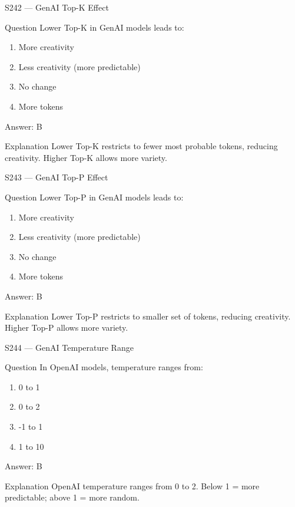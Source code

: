 \documentclass[aspectratio=169,8pt]{beamer}
\begin{document}
\begin{frame}{S242 --- GenAI Top-K Effect}
	\begin{block}{Question}
		Lower Top-K in GenAI models leads to:
		\begin{enumerate}
			\item More creativity
			\item Less creativity (more predictable)
			\item No change
			\item More tokens
		\end{enumerate}
	\end{block}
	\begin{exampleblock}{Answer: B}\end{exampleblock}
	\begin{block}{Explanation}
		Lower Top-K restricts to fewer most probable tokens, reducing creativity. Higher Top-K allows more variety.
	\end{block}
\end{frame}

\begin{frame}{S243 --- GenAI Top-P Effect}
	\begin{block}{Question}
		Lower Top-P in GenAI models leads to:
		\begin{enumerate}
			\item More creativity
			\item Less creativity (more predictable)
			\item No change
			\item More tokens
		\end{enumerate}
	\end{block}
	\begin{exampleblock}{Answer: B}\end{exampleblock}
	\begin{block}{Explanation}
		Lower Top-P restricts to smaller set of tokens, reducing creativity. Higher Top-P allows more variety.
	\end{block}
\end{frame}

\begin{frame}{S244 --- GenAI Temperature Range}
	\begin{block}{Question}
		In OpenAI models, temperature ranges from:
		\begin{enumerate}
			\item 0 to 1
			\item 0 to 2
			\item -1 to 1
			\item 1 to 10
		\end{enumerate}
	\end{block}
	\begin{exampleblock}{Answer: B}\end{exampleblock}
	\begin{block}{Explanation}
		OpenAI temperature ranges from 0 to 2. Below 1 = more predictable; above 1 = more random.
	\end{block}
\end{frame}
\end{document}
